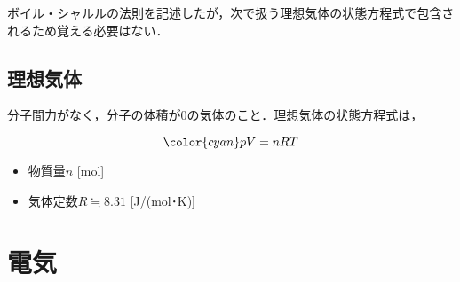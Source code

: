 \documentclass[a4paper,11pt]{ltjsarticle}
\begin{document}
ボイル・シャルルの法則を記述したが，次で扱う理想気体の状態方程式で包含されるため覚える必要はない．

\subsection{理想気体}

分子間力がなく，分子の体積が0の気体のこと．理想気体の状態方程式は，

\begin{equation*}
    {\color{cyan} pV = nRT}
\end{equation*}

\begin{itemize}
    \item 物質量$n$ [mol]
    \item 気体定数$R \fallingdotseq 8.31$ [J/(mol･K)]
\end{itemize}

\pagestyle{fancy}
\rhead{}
\cfoot{\thepage}

\section{電気}
\end{document}
